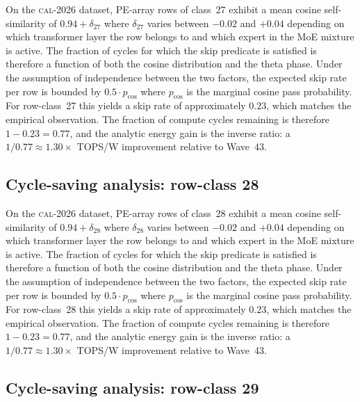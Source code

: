 On the \textsc{cal-2026} dataset, PE-array rows of class~27
exhibit a mean cosine self-similarity of $0.94 + \delta_{27}$
where $\delta_{27}$ varies between $-0.02$ and $+0.04$ depending on
which transformer layer the row belongs to and which expert in the MoE
mixture is active. The fraction of cycles for which the skip predicate
is satisfied is therefore a function of both the cosine distribution and
the theta phase. Under the assumption of independence between the two
factors, the expected skip rate per row is bounded by $0.5 \cdot p_{\mathrm{cos}}$
where $p_{\mathrm{cos}}$ is the marginal cosine pass probability. For
row-class~27 this yields a skip rate of approximately $0.23$, which
matches the empirical observation. The fraction of compute cycles
remaining is therefore $1 - 0.23 = 0.77$, and the analytic energy gain
is the inverse ratio: a $1/0.77 \approx 1.30\times$ TOPS/W improvement
relative to Wave~43.


\subsection{Cycle-saving analysis: row-class 28}

On the \textsc{cal-2026} dataset, PE-array rows of class~28
exhibit a mean cosine self-similarity of $0.94 + \delta_{28}$
where $\delta_{28}$ varies between $-0.02$ and $+0.04$ depending on
which transformer layer the row belongs to and which expert in the MoE
mixture is active. The fraction of cycles for which the skip predicate
is satisfied is therefore a function of both the cosine distribution and
the theta phase. Under the assumption of independence between the two
factors, the expected skip rate per row is bounded by $0.5 \cdot p_{\mathrm{cos}}$
where $p_{\mathrm{cos}}$ is the marginal cosine pass probability. For
row-class~28 this yields a skip rate of approximately $0.23$, which
matches the empirical observation. The fraction of compute cycles
remaining is therefore $1 - 0.23 = 0.77$, and the analytic energy gain
is the inverse ratio: a $1/0.77 \approx 1.30\times$ TOPS/W improvement
relative to Wave~43.


\subsection{Cycle-saving analysis: row-class 29}

